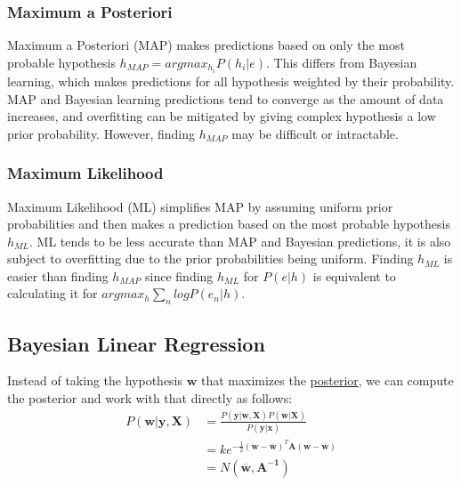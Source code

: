 \documentclass[12pt]{article}
\begin{document}
        \subsubsection{Maximum a Posteriori} \label{sec:MAP} Maximum a Posteriori (MAP) makes predictions based on only the
            most probable hypothesis $h_{MAP} = argmax_{h_i}P(h_i | e)$. This differs from Bayesian learning, which makes
            predictions for all hypothesis weighted by their probability. MAP and Bayesian learning predictions tend to
            converge as the amount of data increases, and overfitting can be mitigated by giving complex hypothesis a low
            prior probability. However, finding $h_{MAP}$ may be difficult or intractable.

        \subsubsection{Maximum Likelihood} \label{sec:ML} Maximum Likelihood (ML) simplifies MAP by assuming uniform prior
            probabilities and then makes a prediction based on the most probable hypothesis $h_{ML}$. ML tends to be less
            accurate than MAP and Bayesian predictions, it is also subject to overfitting due to the prior probabilities
            being uniform. Finding $h_{ML}$ is easier than finding $h_{MAP}$ since finding $h_{ML}$ for $P(e|h)$ is
            equivalent to calculating it for $argmax_h \sum_n logP(e_n |h)$.

    \subsection{Bayesian Linear Regression} \label{sec:BayesianLinearRegression}
        Instead of taking the hypothesis $\boldsymbol{w}$ that maximizes the \hyperref[fact:Posterior]{posterior}, we
        can compute the posterior and work with that directly as follows:
        \begin{align*}
            P(\boldsymbol{w}|\boldsymbol{y}, \boldsymbol{X}) &= \frac{P(\boldsymbol{y}|\boldsymbol{w}, \boldsymbol{X})P(\boldsymbol{w}|\boldsymbol{X})}{P(\boldsymbol{y}|\boldsymbol{x})} \\
            &= ke^{-\frac{1}{2}(\boldsymbol{w}-\overline{\boldsymbol{w}})^T\boldsymbol{A}(\boldsymbol{w}-\overline{\boldsymbol{w}})} \\
            &= N(\overline{\boldsymbol{w}}, \boldsymbol{A^{-1}})
        \end{align*}
\end{document}
